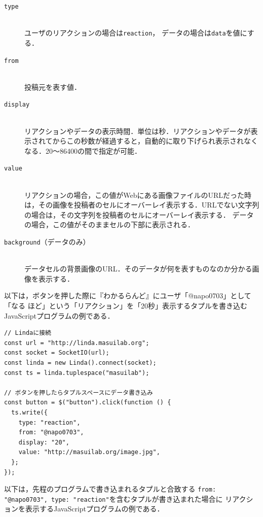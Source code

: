 \vspace{2mm}
\begin{description}
\item[\texttt{type}]\mbox{}\\
ユーザのリアクションの場合は\texttt{reaction}，
データの場合は\texttt{data}を値にする．

\item[\texttt{from}]\mbox{}\\
投稿元を表す値．

\item[\texttt{display}]\mbox{}\\
リアクションやデータの表示時間．単位は秒．リアクションやデータが表示されてからこの秒数が経過すると，自動的に取り下げられ表示されなくなる．20〜86400の間で指定が可能．

\item[\texttt{value}]\mbox{}\\
リアクションの場合，この値がWebにある画像ファイルのURLだった時は，その画像を投稿者のセルにオーバーレイ表示する．URLでない文字列の場合は，その文字列を投稿者のセルにオーバーレイ表示する．
データの場合，この値がそのままセルの下部に表示される．

\item[\texttt{background}（データのみ）]\mbox{}\\
データセルの背景画像のURL．そのデータが何を表すものなのか分かる画像を表示する．
\end{description}
\vspace{4mm}

以下は，ボタンを押した際に『わかるらんど』にユーザ「@napo0703」として「なる ほど」という「リアクション」を「20秒」表示するタプルを書き込むJavaScriptプログラムの例である．

\vspace{2mm}
\begin{lstlisting}
// Lindaに接続
const url = "http://linda.masuilab.org";
const socket = SocketIO(url);
const linda = new Linda().connect(socket);
const ts = linda.tuplespace("masuilab");

// ボタンを押したらタプルスペースにデータ書き込み
const button = $("button").click(function () {
  ts.write({
    type: "reaction",
    from: "@napo0703",
    display: "20",
    value: "http://masuilab.org/image.jpg",
  };
});
\end{lstlisting}

以下は，先程のプログラムで書き込まれるタプルと合致する
\texttt{{from: "@napo0703", type: "reaction"}}を含むタプルが書き込まれた場合に
リアクションを表示するJavaScriptプログラムの例である．

